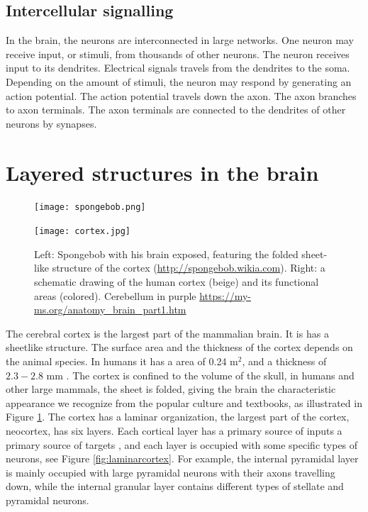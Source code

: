 \documentclass{uiophd}
\begin{document}
\subsection{Intercellular signalling}
In the brain, the neurons are interconnected in large networks. One neuron may receive input, or stimuli, from thousands of other neurons. The neuron receives input to its dendrites. Electrical signals travels from the dendrites to the soma. Depending on the amount of stimuli, the neuron may respond by generating an action potential. The action potential travels down the axon. The axon branches to axon terminals. The axon terminals are connected to the dendrites of other neurons by synapses. 

\section{Layered structures in the brain}\label{Layered structures}
\begin{figure}[!tbp]
  \centering
  \begin{minipage}[b]{0.425\textwidth}
    \texttt{[image: spongebob.png]}
  \end{minipage}
  \hfill
  \begin{minipage}[b]{0.525\textwidth}
    \texttt{[image: cortex.jpg]}
  \end{minipage}  
   \caption{Left: Spongebob with his brain exposed, featuring the folded sheet-like structure of the cortex (\url{http://spongebob.wikia.com}). Right: a schematic drawing of the human cortex (beige) and its functional areas (colored). Cerebellum in purple \url{https://my-ms.org/anatomy\_brain\_part1.htm}}
  \label{fig:spongebob}
\end{figure}

The cerebral cortex is the largest part of the mammalian brain. It is has a sheetlike structure. The surface area and the thickness of the cortex depends on the animal species. In humans it has a area of 0.24 m$^2$, and a thickness of $2.3 - 2.8$ mm \cite{wikipedia}. The cortex is confined to the volume of the skull, in humans and other large mammals, the sheet is folded, giving the brain the characteristic appearance we recognize from the popular culture and textbooks, as illustrated in Figure  \ref{fig:spongebob}.  The cortex has a laminar organization, the largest part of the cortex, neocortex, has six layers. Each cortical layer has a primary source of inputs a primary source of targets \cite{Neuroscience}, and each layer is occupied with some specific types of neurons, see Figure \ref{fig:laminarcortex}. For example, the internal pyramidal layer is mainly occupied with large pyramidal neurons with their axons travelling down, while the  internal granular layer contains different types of stellate and pyramidal neurons. 
\end{document}
